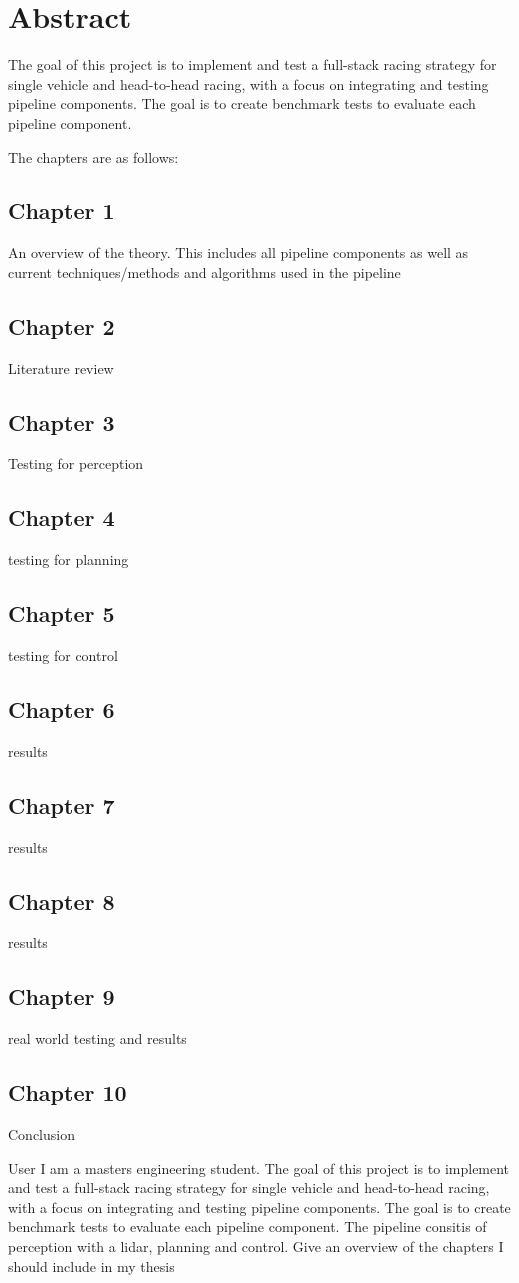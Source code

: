 \chapter{Abstract}

The goal of this project is to implement and test a full-stack racing strategy for single vehicle and head-to-head racing, with a focus on integrating and testing pipeline components. The goal is to create benchmark tests to evaluate each pipeline component.

The chapters are as follows:
\section{Chapter 1}
An overview of the theory. This includes all pipeline components as well as current techniques/methods and algorithms used in the pipeline
\section{Chapter 2}
Literature review
\section{Chapter 3}
Testing for perception
\section{Chapter 4}
testing for planning
\section{Chapter 5}
testing for control
\section{Chapter 6}
results
\section{Chapter 7}
results
\section{Chapter 8}
results
\section{Chapter 9}
real world testing and results
\section{Chapter 10}
Conclusion


User
I am a masters engineering student. The goal of this project is to implement and test a full-stack racing strategy for single vehicle and head-to-head racing, with a focus on integrating and testing pipeline components. The goal is to create benchmark tests to evaluate each pipeline component. The pipeline consitis of perception with a lidar, planning and control. Give an overview of the chapters I should include in my thesis